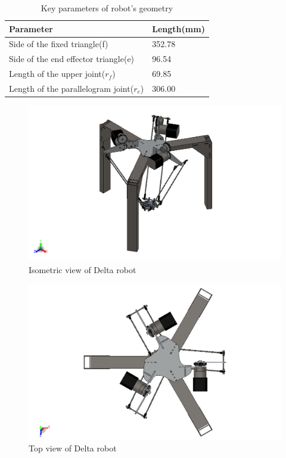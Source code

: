 \begin{table}[H]
	\centering
	\caption{Key parameters of robot's geometry}	
	\label{tab:key_parameters_of_robot_geometry}
	\begin{tabularx}{0.65\textwidth}{ll}
		\toprule
		\textbf{Parameter} & \textbf{Length(mm)} 		\\
		\midrule
		Side of the fixed triangle(f) & 352.78 			\\
		\midrule
		Side of the end effector triangle(e) & 96.54 	\\
		\midrule
		Length of the upper joint($r_{f}$) & 69.85 		\\
		\midrule
		Length of the parallelogram joint($r_{e}$) & 306.00 \\
		\bottomrule
	\end{tabularx}
\end{table}
\begin{figure}[H]
	\centering
	\includegraphics[width=\maxwidth{15cm}, keepaspectratio]{Chapters/Fig/robot_isometric_view.png}
	\caption{Isometric view of Delta robot}
	\label{fig:robot_isometric_view}
\end{figure}

\begin{figure}[H]
	\centering
	\includegraphics[width=\maxwidth{15cm}, keepaspectratio]{Chapters/Fig/robot_top_view.png}
	\caption{Top view of Delta robot}
	\label{fig:robot_top_view}
\end{figure}

